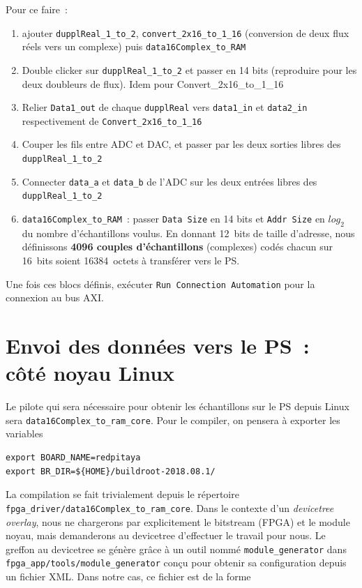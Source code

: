 \documentclass[12pt,oneside]{article}
\begin{document}
Pour ce faire~:
\begin{enumerate}
\item ajouter {\tt dupplReal\_1\_to\_2}, {\tt convert\_2x16\_to\_1\_16} (conversion de 
deux flux r\'eels vers un complexe) puis {\tt data16Complex\_to\_RAM}
\item Double clicker sur {\tt dupplReal\_1\_to\_2} et passer en 14 bits (reproduire
pour les deux doubleurs de flux). Idem pour {Convert\_2x16\_to\_1\_16}
\item Relier {\tt Data1\_out} de chaque {\tt dupplReal} vers {\tt data1\_in} et 
{\tt data2\_in} respectivement de {\tt Convert\_2x16\_to\_1\_16}
\item Couper les fils entre ADC et DAC, et passer par les deux sorties libres des
{\tt dupplReal\_1\_to\_2} 
\item Connecter {\tt data\_a} et {\tt data\_b} de l'ADC sur les deux entr\'ees libres 
des {\tt dupplReal\_1\_to\_2}
\item {\tt data16Complex\_to\_RAM}~: passer {\tt Data Size} en 14 bits et 
{\tt Addr Size} en $log_2$ du nombre d'\'echantillons voulus. En donnant 12~bits de
taille d'adresse, nous d\'efinissons {\bf 4096 couples d'\'echantillons} (complexes) 
cod\'es chacun sur 16~bits soient 16384~octets \`a transf\'erer vers le PS.
\end{enumerate}

Une fois ces blocs d\'efinis, ex\'ecuter {\tt Run Connection Automation} pour la 
connexion au bus AXI. 

\section{Envoi des donn\'ees vers le PS~: c\^ot\'e noyau Linux}

Le pilote qui sera n\'ecessaire pour obtenir les \'echantillons sur le PS depuis Linux 
sera {\tt data16Complex\_to\_ram\_core}. Pour le compiler, on pensera \`a exporter les 
variables

\begin{verbatim}
export BOARD_NAME=redpitaya
export BR_DIR=${HOME}/buildroot-2018.08.1/
\end{verbatim}

La compilation se fait trivialement depuis le r\'epertoire {\tt 
fpga\_driver/data16Complex\_to\_ram\_core}. Dans le contexte d'un {\em devicetree overlay},
nous ne chargerons par explicitement le bitstream (FPGA) et le module noyau, mais demanderons
au devicetree d'effectuer le travail pour nous. Le greffon au devicetree se g\'en\`ere gr\^ace
\`a un outil nomm\'e {\tt module\_generator} dans {\tt fpga\_app/tools/module\_generator}
con\c cu pour obtenir sa configuration depuis un fichier XML. Dans notre cas, ce fichier est
de la forme
\end{document}
